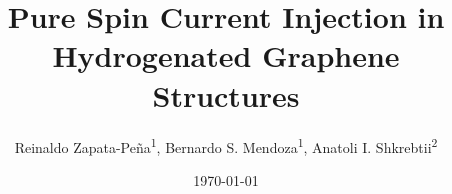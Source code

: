 \documentclass[prb,11pt,tightenlines,twocolumn,aps]{revtex4-1}
\begin{document}
\title{Pure Spin Current Injection in Hydrogenated Graphene Structures}
\author{Reinaldo Zapata-Pe\~na\textsuperscript{1},
        Bernardo S. Mendoza\textsuperscript{1},
        Anatoli I. Shkrebtii\textsuperscript{2}}

\date{\today}

\begin{abstract}
\blindtext
\end{abstract}

\maketitle

\end{document}
